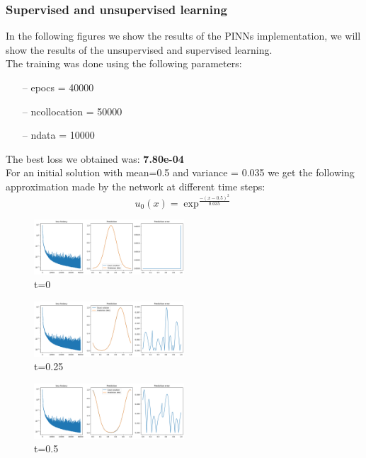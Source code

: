 \documentclass{article}
\begin{document}
\subsubsection{Supervised and unsupervised learning}

In the following figures we show the results of the PINNs implementation, we will show the results of the unsupervised and supervised learning.\\

The training was done using the following parameters:

\begin{itemize}
   \item[--] epocs = 40000
   \item[--] ncollocation = 50000
   \item[--] ndata = 10000
\end{itemize} The best loss we obtained was: \textbf{7.80e-04} \\
For an initial solution with mean=0.5 and variance = 0.035 we get the following approximation made by the network at different time steps:\\

\begin{equation*}
    u_0(x) = \exp^{\frac{-(x-0.5)^2}{0.035}}
\end{equation*}

\begin{figure}[!h]
    \centering
    \includegraphics[width=0.5\textwidth]{images/r1.png}
    \caption{t=0}
\end{figure}
\begin{figure}[!h]
    \centering
    \includegraphics[width=0.5\textwidth]{images/r2.png}
    \caption{t=0.25}
\end{figure}
\begin{figure}[!h]
    \centering
    \includegraphics[width=0.5\textwidth]{images/r3.png}
    \caption{t=0.5}
\end{figure}
\end{document}
